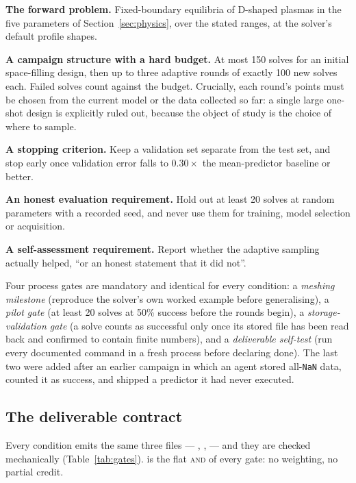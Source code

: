 \textbf{The forward problem.} Fixed-boundary equilibria of D-shaped plasmas in
the five parameters of Section~\ref{sec:physics}, over the stated ranges, at the
solver's default profile shapes.

\textbf{A campaign structure with a hard budget.} At most 150 solves for an
initial space-filling design, then up to three adaptive rounds of exactly 100
new solves each. Failed solves count against the budget. Crucially, each round's
points must be chosen from the current model or the data collected so far: a
single large one-shot design is explicitly ruled out, because the object of
study is the choice of where to sample.

\textbf{A stopping criterion.} Keep a validation set separate from the test set,
and stop early once validation error falls to $0.30\times$ the mean-predictor
baseline or better.

\textbf{An honest evaluation requirement.} Hold out at least 20 solves at random
parameters with a recorded seed, and never use them for training, model
selection or acquisition.

\textbf{A self-assessment requirement.} Report whether the adaptive sampling
actually helped, ``or an honest statement that it did not''.

Four process gates are mandatory and identical for every condition: a
\emph{meshing milestone} (reproduce the solver's own worked example before
generalising), a \emph{pilot gate} (at least 20 solves at 50\% success before
the rounds begin), a \emph{storage-validation gate} (a solve counts as
successful only once its stored file has been read back and confirmed to contain
finite numbers), and a \emph{deliverable self-test} (run every documented
command in a fresh process before declaring done). The last two were added after
an earlier campaign in which an agent stored all-\texttt{NaN} data, counted it as
success, and shipped a predictor it had never executed.

\subsection{The deliverable contract}
\label{sec:contract}

Every condition emits the same three files --- ,
,  --- and they are checked mechanically
(Table~\ref{tab:gates}).  is the flat \textsc{and} of
every gate: no weighting, no partial credit.

